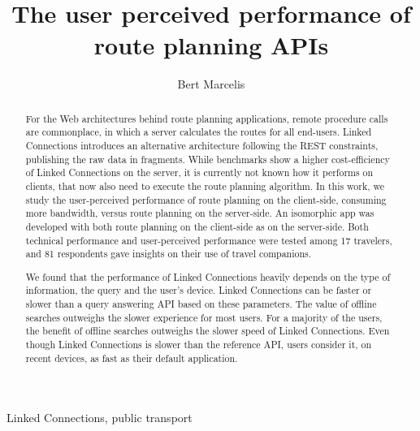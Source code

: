 \documentclass[twocolumn]{phdsymp} %
\begin{document}
\title{The user perceived performance of route planning APIs} %

\author{Bert Marcelis}


\maketitle

\begin{abstract}

For the Web architectures behind route planning applications, remote procedure calls are commonplace, in which a server calculates the routes for all end-users.
Linked Connections introduces an alternative architecture following the REST constraints, publishing the raw data in fragments.
While benchmarks show a higher cost-efficiency of Linked Connections on the server, it is currently not known how it performs on clients, that now also need to execute the route planning algorithm.
In this work, we study the user-perceived performance of route planning on the client-side, consuming more bandwidth, versus route planning on the server-side. 
An isomorphic app was developed with both route planning on the client-side as on the server-side.
Both technical performance and user-perceived performance were tested among 17 travelers, and 81 respondents gave insights on their use of travel companions.

We found that the performance of Linked Connections heavily depends on the type of information, the query and the user’s device. Linked Connections can be faster or slower than a query answering API based on these parameters. 
The value of offline searches outweighs the slower experience for most users.
For a majority of the users, the benefit of offline searches outweighs the slower speed of Linked Connections. Even though Linked Connections is slower than the reference API, users consider it, on recent devices, as fast as their default application.

\end{abstract}

\begin{keywords}
Linked Connections, public transport
\end{keywords}
\end{document}
